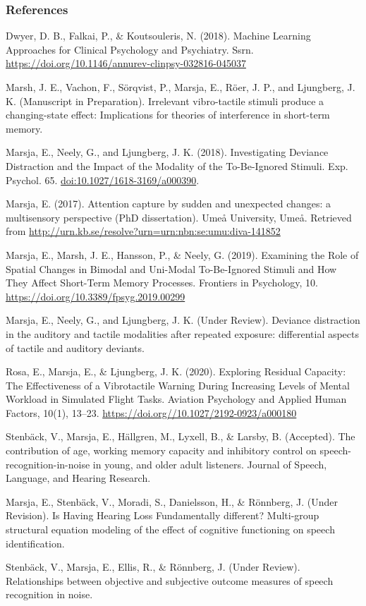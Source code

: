 \documentclass[]{article}
\begin{document}
\hypertarget{references}{%
\subsubsection{References}\label{references}}

Dwyer, D. B., Falkai, P., \& Koutsouleris, N. (2018). Machine Learning
Approaches for Clinical Psychology and Psychiatry. Ssrn.
\url{https://doi.org/10.1146/annurev-clinpsy-032816-045037}

Marsh, J. E., Vachon, F., Sörqvist, P., Marsja, E., Röer, J. P., and
Ljungberg, J. K. (Manuscript in Preparation). Irrelevant vibro-tactile
stimuli produce a changing-state effect: Implications for theories of
interference in short-term memory.

Marsja, E., Neely, G., and Ljungberg, J. K. (2018). Investigating
Deviance Distraction and the Impact of the Modality of the To-Be-Ignored
Stimuli. Exp. Psychol. 65. \url{doi:10.1027/1618-3169/a000390}.

Marsja, E. (2017). Attention capture by sudden and unexpected changes: a
multisensory perspective (PhD dissertation). Umeå University, Umeå.
Retrieved from
\url{http://urn.kb.se/resolve?urn=urn:nbn:se:umu:diva-141852}

Marsja, E., Marsh, J. E., Hansson, P., \& Neely, G. (2019). Examining
the Role of Spatial Changes in Bimodal and Uni-Modal To-Be-Ignored
Stimuli and How They Affect Short-Term Memory Processes. Frontiers in
Psychology, 10. \url{https://doi.org/10.3389/fpsyg.2019.00299}

Marsja, E., Neely, G., and Ljungberg, J. K. (Under Review). Deviance
distraction in the auditory and tactile modalities after repeated
exposure: differential aspects of tactile and auditory deviants.

Rosa, E., Marsja, E., \& Ljungberg, J. K. (2020). Exploring Residual
Capacity: The Effectiveness of a Vibrotactile Warning During Increasing
Levels of Mental Workload in Simulated Flight Tasks. Aviation Psychology
and Applied Human Factors, 10(1), 13--23.
\url{https://doi.org//10.1027/2192-0923/a000180}

Stenbäck, V., Marsja, E., Hällgren, M., Lyxell, B., \& Larsby, B.
(Accepted). The contribution of age, working memory capacity and
inhibitory control on speech-recognition-in-noise in young, and older
adult listeners. Journal of Speech, Language, and Hearing Research.

Marsja, E., Stenbäck, V., Moradi, S., Danielsson, H., \& Rönnberg, J.
(Under Revision). Is Having Hearing Loss Fundamentally different?
Multi-group structural equation modeling of the effect of cognitive
functioning on speech identification.

Stenbäck, V., Marsja, E., Ellis, R., \& Rönnberg, J. (Under Review).
Relationships between objective and subjective outcome measures of
speech recognition in noise.
\end{document}
